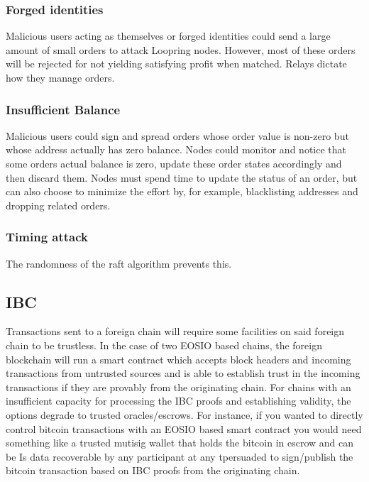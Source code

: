 \documentclass[]{article}
\begin{document}
		\subsubsection{Forged identities}
		Malicious users acting as themselves or forged identities 
		could send a large amount of small orders to attack Loopring
		nodes. However, most of these orders will be rejected 
		for not yielding satisfying profit when matched. 
		Relays dictate how they manage orders.
		
		\subsubsection{Insufficient Balance}
		Malicious users could sign and spread orders whose order 
		value is non-zero but whose address actually has zero 
		balance. Nodes could monitor and notice that some orders 
		actual balance is zero, update these order states accordingly
		and then discard them. Nodes must spend time to update
		the status of an order, but can also choose to minimize the
		effort by, for example, blacklisting addresses and dropping
		related orders.
		
		\subsubsection{Timing attack} 
		The randomness of the raft algorithm prevents this.
		
	
		
	\subsection{IBC}
	
	Transactions sent to a foreign chain will require some facilities on said foreign chain to be trustless. 
	In the case of two EOSIO based chains, the foreign blockchain will run a smart contract which accepts block headers and incoming transactions from untrusted sources and is able to establish trust in the incoming transactions if they are provably from the originating chain. 
	For chains with an insufficient capacity for processing the IBC proofs and establishing validity, the options degrade to trusted oracles/escrows.
	For instance, if you wanted to directly control bitcoin transactions with an EOSIO based smart contract you would need something like a trusted mutisig wallet that holds the bitcoin in escrow and can be 	Is data recoverable by any participant at any tpersuaded to sign/publish the bitcoin transaction based on IBC proofs from the originating chain.
	
\end{document}
